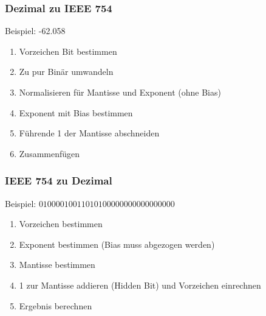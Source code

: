 \documentclass[12pt]{article}
\begin{document}
\subsubsection{Dezimal zu IEEE 754}
Beispiel: -62.058
\begin{enumerate}
    \item Vorzeichen Bit bestimmen
    \item Zu pur Binär umwandeln
    \item Normalisieren für Mantisse und Exponent (ohne Bias)
    \item Exponent mit Bias bestimmen
    \item Führende 1 der Mantisse abschneiden
    \item Zusammenfügen
\end{enumerate}
\subsubsection{IEEE 754 zu Dezimal}
Beispiel: $01000010011010100000000000000000$
\begin{enumerate}
    \item Vorzeichen bestimmen
    \item Exponent bestimmen (Bias muss abgezogen werden)
    \item Mantisse bestimmen
    \item 1 zur Mantisse addieren (Hidden Bit) und Vorzeichen einrechnen
    \item Ergebnis berechnen
\end{enumerate}
\end{document}

